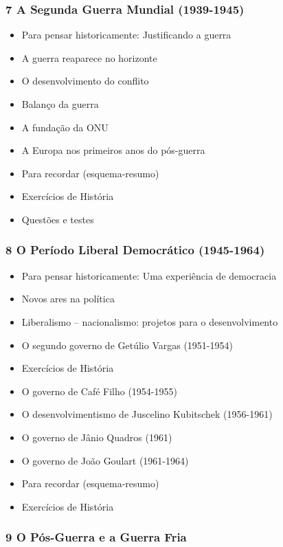 \documentclass[a4paper,12pt]{article}[abntex2]
\begin{document}
\subsubsection*{7 A Segunda Guerra Mundial (1939-1945)}

\begin{itemize}
\item Para pensar historicamente: Justificando a guerra
\item A guerra reaparece no horizonte
\item O desenvolvimento do conflito
\item Balanço da guerra
\item A fundação da ONU
\item A Europa nos primeiros anos do pós-guerra
\item Para recordar (esquema-resumo)
\item Exercícios de História
\item Questões e testes
\end{itemize}
\subsubsection*{8 O Período Liberal Democrático (1945-1964)}

\begin{itemize}
\item Para pensar historicamente: Uma experiência de democracia
\item Novos ares na política
\item Liberalismo – nacionalismo: projetos para o desenvolvimento
\item O segundo governo de Getúlio Vargas (1951-1954)
\item Exercícios de História
\item O governo de Café Filho (1954-1955)
\item O desenvolvimentismo de Juscelino Kubitschek (1956-1961)
\item O governo de Jânio Quadros (1961)
\item O governo de João Goulart (1961-1964)
\item Para recordar (esquema-resumo)
\item Exercícios de História
\end{itemize}
\subsubsection*{9 O Pós-Guerra e a Guerra Fria}
\end{document}
